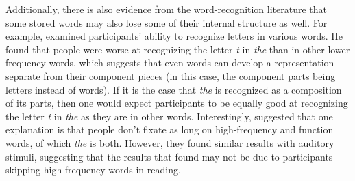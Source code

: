 \documentclass[
  authoryear,
  preprint,
  1p,
  onecolumn]{elsarticle}
\begin{document}
Additionally, there is also evidence from the word-recognition
literature that some stored words may also lose some of their internal
structure as well. For example, \citet{healy1976} examined participants'
ability to recognize letters in various words. He found that people were
worse at recognizing the letter \emph{t} in \emph{the} than in other
lower frequency words, which suggests that even words can develop a
representation separate from their component pieces (in this case, the
component parts being letters instead of words). If it is the case that
\emph{the} is recognized as a composition of its parts, then one would
expect participants to be equally good at recognizing the letter
\emph{t} in \emph{the} as they are in other words. Interestingly,
\citet{kapatsinski2009} suggested that one explanation is that people
don't fixate as long on high-frequency and function words, of which
\emph{the} is both. However, they found similar results with auditory
stimuli, suggesting that the results that \citet{healy1976} found may
not be due to participants skipping high-frequency words in reading.
\end{document}
